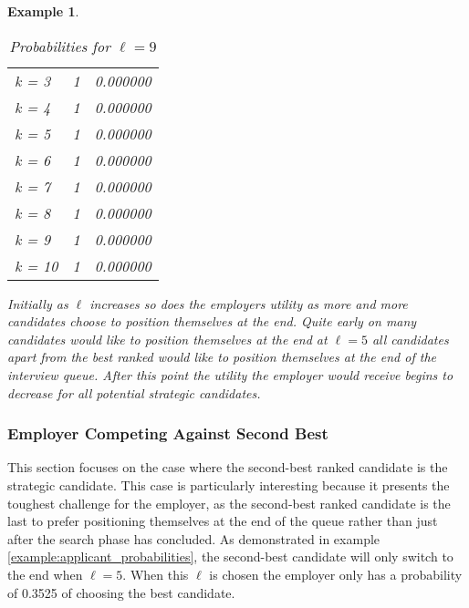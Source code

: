 \documentclass{article}
\newtheorem{example}{Example} %
\begin{document}
\begin{example}
\begin{table}[H]
\begin{minipage}{0.33\textwidth}
\begin{tabular}{lrr}
k = 3  &     1 &         0.000000 \\
k = 4  &     1 &         0.000000 \\
k = 5  &     1 &         0.000000 \\
k = 6  &     1 &         0.000000 \\
k = 7  &     1 &         0.000000 \\
k = 8  &     1 &         0.000000 \\
k = 9  &     1 &         0.000000 \\
k = 10 &     1 &         0.000000 \\
\hline
\end{tabular}
\caption{Probabilities for $\ell=9$}
\end{minipage}\hfill
\end{table}
Initially as $\ell$ increases so does the employers utility as more and more candidates choose to position themselves at the end. Quite early on many candidates would like to position themselves at the end at $\ell = 5$ all candidates apart from the best ranked would like to position themselves at the end of the interview queue. After this point the utility the employer would receive begins to decrease for all potential strategic candidates.
\end{example}

\subsubsection{Employer Competing Against Second Best}

This section focuses on the case where the second-best ranked candidate is the strategic candidate. This case is particularly interesting because it presents the toughest challenge for the employer, as the second-best ranked candidate is the last to prefer positioning themselves at the end of the queue rather than just after the search phase has concluded. As demonstrated in example \ref{example:applicant_probabilities}, the second-best candidate will only switch to the end when $\ell = 5$. When this $\ell$ is chosen the employer only has a probability of 0.3525 of choosing the best candidate. 
\end{document}

